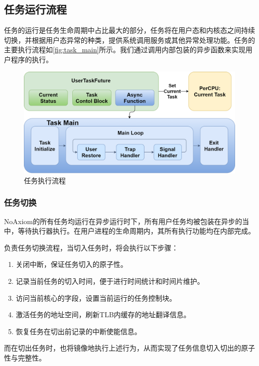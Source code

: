 \documentclass{article}
\begin{document}
\subsection{任务运行流程}

任务的运行是任务生命周期中占比最大的部分，任务将在用户态和内核态之间持续切换，并根据用户态异常的种类，提供系统调用服务或其他异常处理功能。任务的主要执行流程如\autoref{fig:task_main}所示。我们通过调用内部包装的异步函数来实现用户程序的执行。

\begin{figure}[H]
    \centering
    \includegraphics[width=0.75\linewidth]{assets//task/task_main.drawio.png}
    \caption{任务执行流程}
    \label{fig:task_main}
\end{figure}

\subsubsection{任务切换}

NoAxiom的所有任务均运行在异步运行时下，所有用户任务均被包装在异步的当中，等待执行器执行。在用户进程的生命周期内，其所有执行功能均在内部完成。

负责任务切换流程，当切入任务时，将会执行以下步骤：

\begin{enumerate}
    \item 关闭中断，保证任务切入的原子性。
    \item 记录当前任务的切入时间，便于进行时间统计和时间片维护。
    \item 访问当前核心的字段，设置当前运行的任务控制块。
    \item 激活任务的地址空间，刷新TLB内缓存的地址翻译信息。
    \item 恢复任务在切出前记录的中断使能信息。
\end{enumerate}

而在切出任务时，也将镜像地执行上述行为，从而实现了任务信息切入切出的原子性与完整性。
\end{document}
